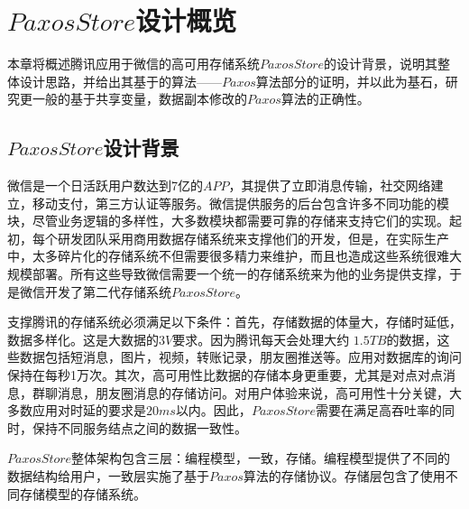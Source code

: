 \chapter{$PaxosStore$设计概览}
\label{chapter:overview}
\par 本章将概述腾讯应用于微信的高可用存储系统$PaxosStore$的设计背景，说明其整体设计思路，并给出其基于的算法——$Paxos$算法部分的证明，并以此为基石，研究更一般的基于共享变量，数据副本修改的$Paxos$算法的正确性。
\section{$PaxosStore$设计背景}
	\label{section:struct}
	\par 微信是一个日活跃用户数达到7亿的$APP$，其提供了立即消息传输，社交网络建立，移动支付，第三方认证等服务。微信提供服务的后台包含许多不同功能的模块，尽管业务逻辑的多样性，大多数模块都需要可靠的存储来支持它们的实现。起初，每个研发团队采用商用数据存储系统来支撑他们的开发，但是，在实际生产中，太多碎片化的存储系统不但需要很多精力来维护，而且也造成这些系统很难大规模部署。所有这些导致微信需要一个统一的存储系统来为他的业务提供支撑，于是微信开发了第二代存储系统$PaxosStore$。
	\par 支撑腾讯的存储系统必须满足以下条件：首先，存储数据的体量大，存储时延低，数据多样化。这是大数据的3$V$要求。因为腾讯每天会处理大约 $1.5TB$的数据，这些数据包括短消息，图片，视频，转账记录，朋友圈推送等。应用对数据库的询问保持在每秒1万次。其次，高可用性比数据的存储本身更重要，尤其是对点对点消息，群聊消息，朋友圈消息的存储访问。对用户体验来说，高可用性十分关键，大多数应用对时延的要求是$20ms$以内。因此，$PaxosStore$需要在满足高吞吐率的同时，保持不同服务结点之间的数据一致性。
	\par $PaxosStore$整体架构包含三层：编程模型，一致，存储。编程模型提供了不同的数据结构给用户，一致层实施了基于$Paxos$算法的存储协议。存储层包含了使用不同存储模型的存储系统。

